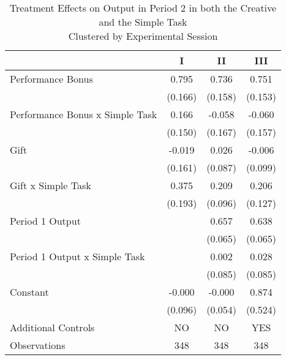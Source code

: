 \begin{table}[h]%
\captionsetup{justification=centering}
\setlength\tabcolsep{2pt}
\caption{Treatment Effects on Output in Period 2 in both the Creative and the Simple Task \\ Clustered by Experimental Session}
\begin{center}%
{\small\renewcommand{\arraystretch}{1}%
\begin{tabular}{lccc}
\hline\noalign{\smallskip}
 & I & II & III \\
\hline\noalign{\smallskip}
Performance Bonus   &       0.795\sym{***}&       0.736\sym{***}&       0.751\sym{***}\\
                    &     (0.166)         &     (0.158)         &     (0.153)         \\[2mm]
Performance Bonus x Simple Task&       0.166         &      -0.058         &      -0.060         \\
                    &     (0.150)         &     (0.167)         &     (0.157)         \\[2mm]
Gift                &      -0.019         &       0.026         &      -0.006         \\
                    &     (0.161)         &     (0.087)         &     (0.099)         \\[2mm]
Gift x Simple Task  &       0.375         &       0.209\sym{*}  &       0.206         \\
                    &     (0.193)         &     (0.096)         &     (0.127)         \\[2mm]
Period 1 Output     &                     &       0.657\sym{***}&       0.638\sym{***}\\
                    &                     &     (0.065)         &     (0.065)         \\[2mm]
Period 1 Output x Simple Task&                     &       0.002         &       0.028         \\
                    &                     &     (0.085)         &     (0.085)         \\[2mm]
Constant            &      -0.000         &      -0.000         &       0.874         \\
                    &     (0.096)         &     (0.054)         &     (0.524)         \\[2mm]
\noalign{\smallskip}\hline
 Additional Controls & NO & NO & YES \\
\hline
Observations        &         348         &         348         &         348         \\

\end{tabular}}
\end{center}
\end{table}
